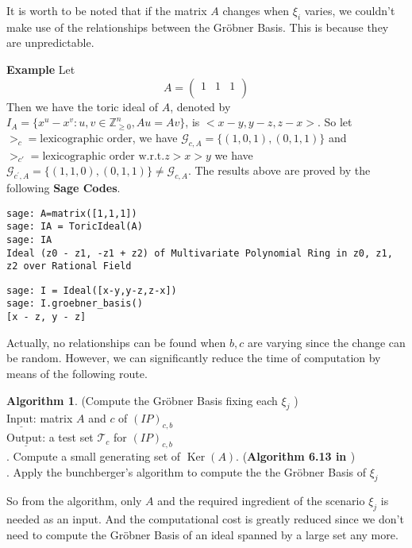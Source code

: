 \documentclass{article}
\theoremstyle{plain}
\theoremstyle{definition}
\newtheorem{algorithm}[theorem]{Algorithm}
\begin{document}
It is worth to be noted that if the matrix $A$  changes when $\xi_i$ varies, we couldn't make use of the relationships between the Gröbner Basis. This is because they are unpredictable.

\noindent\textbf{Example } Let $$A=\begin{pmatrix}
1 & 1 & 1 \\
\end{pmatrix} $$
Then we have  the toric ideal of $A$, denoted by $I_A=\{x^u-x^v: u,v\in \mathbb{Z}_{\geq 0}^n , Au=Av\}$, is $\bigg<x-y,y-z,z-x\bigg >$. So let $>_c=\text{lexicographic order}$, we have $\mathcal{G}_{c,A}=\{(1,0,1),(0,1,1)\}$ and  $>_{c'}=\text{lexicographic order w.r.t.}  z>x>y$ we have $\mathcal{G}_{c^{'},A}=\{(1,1,0),(0,1,1)\}\neq \mathcal{G}_{c,A}$. The results above are proved by the following \textbf{Sage Codes}. \\

\begin{verbatim}
sage: A=matrix([1,1,1])
sage: IA = ToricIdeal(A)
sage: IA
Ideal (z0 - z1, -z1 + z2) of Multivariate Polynomial Ring in z0, z1, z2 over Rational Field
\end{verbatim}

\begin{verbatim}
sage: I = Ideal([x-y,y-z,z-x])
sage: I.groebner_basis()
[x - z, y - z]
\end{verbatim}

Actually, no relationships can be found when $b,c$ are varying since the change can be random.  However, we can significantly reduce the time of computation by means of the following route.\\

\begin{algorithm} (Compute the Gröbner Basis fixing each $\xi_j$ ) \\
$\underline{\text{Input:}}$ matrix $A$ and $c$ of $(I P)_{c, b}$  \\
$\underline{\text {Output:}} $ a test set  $\mathcal{T}_{c}$  for  $(I P)_{c, b}$ \\
. Compute a small generating set of $\operatorname{Ker}(A)$. (\textbf{Algorithm 6.13 in \cite{ref2}})\\
. Apply the bunchberger’s algorithm to compute the the Gröbner Basis of  $\xi_j$\end{algorithm}

So from the algorithm, only $A$ and the required ingredient of the scenario $\xi_j$ is needed as an input. And the computational cost is greatly reduced since we don't need to compute the Gröbner Basis of an ideal spanned by a large set any more. 
\end{document}
